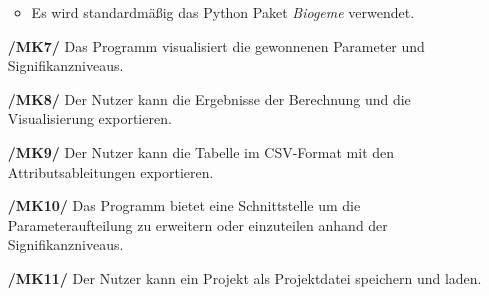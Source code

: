 \documentclass{article}
\begin{document}
\begin{itemize}
    \begin{itemize}
        \item Es wird standardmäßig das Python Paket \textit{Biogeme} verwendet.
    \end{itemize}
    \item[\textbf{/MK7/}] Das Programm visualisiert die gewonnenen Parameter und Signifikanzniveaus.
    \item[\textbf{/MK8/}] Der Nutzer kann die Ergebnisse der Berechnung und die Visualisierung exportieren.
    \item[\textbf{/MK9/}] Der Nutzer kann die Tabelle im CSV-Format mit den Attributsableitungen exportieren.
    \item[\textbf{/MK10/}] Das Programm bietet eine Schnittstelle um die Parameteraufteilung zu erweitern oder einzuteilen anhand der Signifikanzniveaus.
    \item[\textbf{/MK11/}] Der Nutzer kann ein Projekt als Projektdatei speichern und laden.
\end{itemize}
\end{document}
